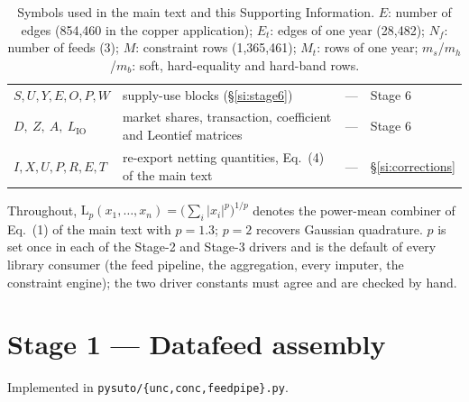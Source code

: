 \documentclass[11pt]{article}
\newcommand{\Lp}[1]{\mathrm{L}_p\!\left(#1\right)}
\begin{document}
\begin{table}[h]
\begin{tabular}{@{}llll@{}}
$S, U, Y, E, O, P, W$ & supply-use blocks (\S\ref{si:stage6}) & --- & Stage 6 \\
$D,\ Z,\ A,\ L_{\mathrm{IO}}$ & market shares, transaction, coefficient and Leontief matrices & --- & Stage 6 \\
$I, X, U, P, R, E, T$ & re-export netting quantities, Eq.~(4) of the main text & --- & \S\ref{si:corrections} \\
\bottomrule
\end{tabular}
\caption{Symbols used in the main text and this Supporting Information.
$E$: number of edges (854{,}460 in the copper application); $E_t$: edges of
one year (28{,}482); $N_f$: number of feeds (3); $M$: constraint rows
(1{,}365{,}461); $M_t$: rows of one year; $m_s$/$m_h$/$m_b$: soft,
hard-equality and hard-band rows.}
\end{table}

Throughout, $\Lp{x_1,\dots,x_n} = \bigl(\sum_i |x_i|^p\bigr)^{1/p}$ denotes
the power-mean combiner of Eq.~(1) of the main text with $p=1.3$; $p=2$
recovers Gaussian quadrature. $p$ is set once in each of the Stage-2 and
Stage-3 drivers and is the default of every library consumer (the feed
pipeline, the aggregation, every imputer, the constraint engine); the two
driver constants must agree and are checked by hand.

\section{Stage 1 --- Datafeed assembly}\label{si:stage1}
Implemented in \texttt{pysuto/\{unc,conc,feedpipe\}.py}.
\end{document}
